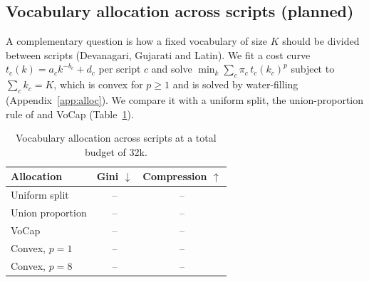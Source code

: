 \begin{table}[t]
\centering
\small
{}
\caption{Effect of the morphology penalty. Compression is bytes per token on the training
text; boundary F1 is measured against the SuTRA gold segmentations.}
\label{tab:morph}
\end{table}

\subsection{Vocabulary allocation across scripts (planned)}
\label{sec:alloc}

A complementary question is how a fixed vocabulary of size $K$ should be divided between
scripts (Devanagari, Gujarati and Latin). We fit a cost curve $t_c(k)=a_c k^{-b_c}+d_c$ per
script $c$ and solve $\min_k \sum_c \pi_c\, t_c(k_c)^p$ subject to $\sum_c k_c=K$, which is
convex for $p\ge1$ and is solved by water-filling (Appendix~\ref{app:alloc}). We compare it
with a uniform split, the union-proportion rule of \citet{brahma2026} and VoCap
\citep{zheng2021vocap} (Table~\ref{tab:alloc}).

\begin{table}[t]
\centering
\small
\begin{tabular}{lcc}
\toprule
Allocation & Gini $\downarrow$ & Compression $\uparrow$\\
\midrule
Uniform split & -- & --\\
Union proportion \citep{brahma2026} & -- & --\\
VoCap \citep{zheng2021vocap} & -- & --\\
Convex, $p=1$ & -- & --\\
Convex, $p=8$ & -- & --\\
\bottomrule
\end{tabular}
\caption{Vocabulary allocation across scripts at a total budget of 32k.}
\label{tab:alloc}
\end{table}

